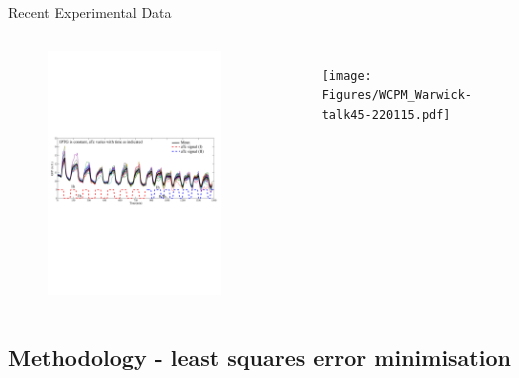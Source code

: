 \documentclass{beamer}
\begin{document}
\begin{frame}{Recent Experimental Data}{}
\begin{columns}
\begin{figure}
   \includegraphics[trim = 10 300 270 290,clip = true,scale = 0.55]{Figures/13_9}
\end{figure}
\vspace{-5mm}
\begin{figure}
   \texttt{[image: Figures/WCPM\_Warwick-talk45-220115.pdf]}
\end{figure}
\end{columns}
\end{frame}


\subsection{Methodology - least squares error minimisation}
\end{document}
